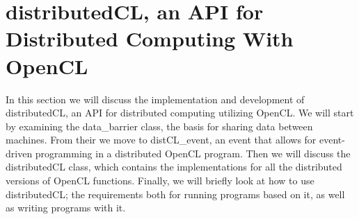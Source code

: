 \documentclass[a4paper,twoside]{report}
\begin{document}




% 
% 

\body



\chapter{distributedCL, an API for Distributed Computing With OpenCL}
In this section we will discuss the implementation and development of distributedCL, an API for distributed computing utilizing OpenCL. We will start by examining the data\_barrier class, the basis for sharing data between machines. From their we move to distCL\_event, an event that allows for event-driven programming in a distributed OpenCL program. Then we will discuss the distributedCL class, which contains the implementations for all the distributed versions of OpenCL functions. Finally, we will briefly look at how to use distributedCL; the requirements both for running programs based on it, as well as writing programs with it.







\appendix




\end{document}
